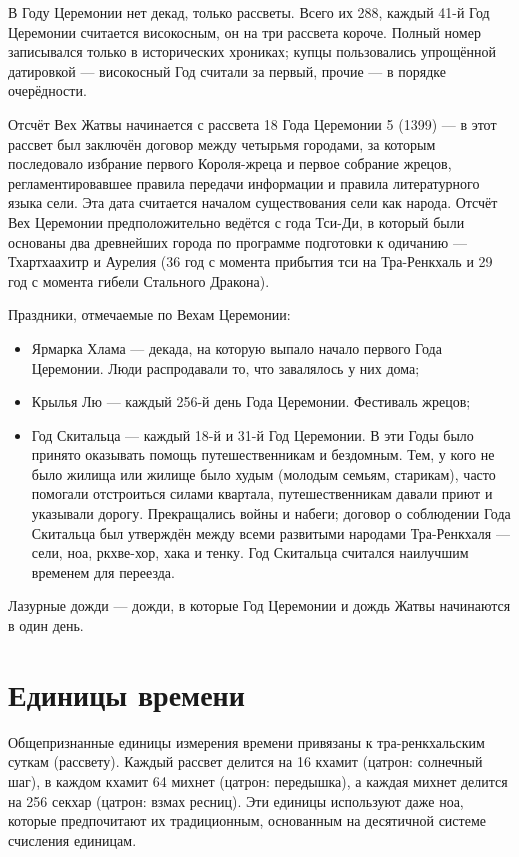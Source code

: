 В Году Церемонии нет декад, только рассветы.
Всего их 288, каждый 41-й Год Церемонии считается високосным, он на три рассвета короче.
Полный номер записывался только в исторических хрониках;
купцы пользовались упрощённой датировкой --- високосный Год считали за первый, прочие --- в порядке очерёдности.

Отсчёт Вех Жатвы начинается с рассвета 18 Года Церемонии 5 (1399) --- в этот рассвет был заключён договор между четырьмя городами, за которым последовало избрание первого Короля-жреца и первое собрание жрецов, регламентировавшее правила передачи информации и правила литературного языка сели.
Эта дата считается началом существования сели как народа.
Отсчёт Вех Церемонии предположительно ведётся с года Тси-Ди, в который были основаны два древнейших города по программе подготовки к одичанию --- Тхартхаахитр и Аурелия (36 год с момента прибытия тси на Тра-Ренкхаль и 29 год с момента гибели Стального Дракона).

Праздники, отмечаемые по Вехам Церемонии:

\begin{itemize}
\item Ярмарка Хлама --- декада, на которую выпало начало первого Года Церемонии.
Люди распродавали то, что завалялось у них дома;
\item Крылья Лю --- каждый 256-й день Года Церемонии. Фестиваль жрецов;
\item Год Скитальца --- каждый 18-й и 31-й Год Церемонии. В эти Годы было принято оказывать помощь путешественникам и бездомным.
Тем, у кого не было жилища или жилище было худым (молодым семьям, старикам), часто помогали отстроиться силами квартала, путешественникам давали приют и указывали дорогу.
Прекращались войны и набеги;
договор о соблюдении Года Скитальца был утверждён между всеми развитыми народами Тра-Ренкхаля --- сели, ноа, ркхве-хор, хака и тенку.
Год Скитальца считался наилучшим временем для переезда.
\end{itemize}

Лазурные дожди --- дожди, в которые Год Церемонии и дождь Жатвы начинаются в один день.


\section{Единицы времени}

Общепризнанные единицы измерения времени привязаны к тра-ренкхальским суткам (рассвету).
Каждый рассвет делится на 16 кхамит (цатрон: солнечный шаг), в каждом кхамит 64 михнет (цатрон: передышка), а каждая михнет делится на 256 секхар (цатрон: взмах ресниц).
Эти единицы используют даже ноа, которые предпочитают их традиционным, основанным на десятичной системе счисления единицам.

